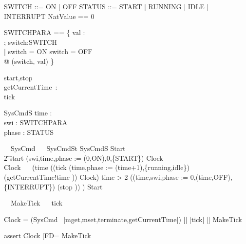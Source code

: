\begin{zed}
SWITCH ::= ON | OFF
\also STATUS ::= START | RUNNING | IDLE | INTERRUPT
\also NatValue == 0 
\end{zed}
\begin{zed}
SWITCHPARA == \{ val  : \nat\\; switch:SWITCH  \\
   | switch = ON \lor switch = OFF \\
   @ (switch, val) \}\\
\end{zed}
\begin{circus}
  \circchannel start,stop\\
  \circchannel getCurrentTime~:~\nat\\
  \circchannel tick
\end{circus}

\begin{schema}{SysCmdS}
 time : \nat\\
 swi : SWITCHPARA\\
 phase : \power STATUS
\end{schema}
\begin{circus}%
  \circprocess\ ~SysCmd ~\circdef~\circbegin
  \circstate SysCmdSt  SysCmdS
  Start ~\circdef~
  \\\t2 start \then (swi,time,phase := (0,ON),0,\{START\}) \circseq Clock\\
  Clock ~\circdef~ 
  (\circif time  \circthen ((tick \then (time,phase := (time+1),\{running,idle\}) \interleave (getCurrentTime!time \then \Skip)) \circseq Clock)
        \circelse time > 2 \circthen ((time,swi,phase := 0,(time,OFF),\{INTERRUPT\}) \circseq (stop \then \Skip)) 
        \circfi)
  \circspot Start
  \circend
\end{circus}
\begin{circus}
\circprocess\ ~MakeTick ~\circdef~\circbegin
\circspot tick \then \Skip
\circend
\end{circus}


Clock = 
  (SysCmd \ {|mget,mset,terminate,getCurrentTime|}) 
  [| {|tick|} |] MakeTick 

assert Clock [FD= MakeTick